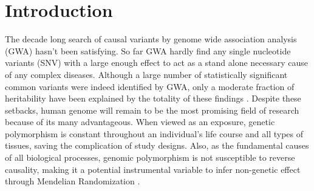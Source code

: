 \section{Introduction}
The decade long search of causal variants by genome wide association analysis (GWA) hasn’t been satisfying. So far GWA hardly find any single nucleotide variants (SNV) with a large enough effect to act as a stand alone necessary cause of any complex diseases. Although a large number of statistically significant common variants were indeed identified by GWA, only a moderate fraction of heritability have been explained by the totality of these findings \cite{GWA1, GWA2}. Despite these setbacks, human genome will remain to be the most promising field of research because of its many advantageous. When viewed as an exposure, genetic polymorphism is constant throughout an individual's life course and all types of tissues, saving the complication of study designs. Also, as the fundamental causes of all biological processes, genomic polymorphism is not susceptible to reverse causality, making it a potential instrumental variable to infer non-genetic effect through Mendelian Randomization \cite{MR1, MR2}. 

